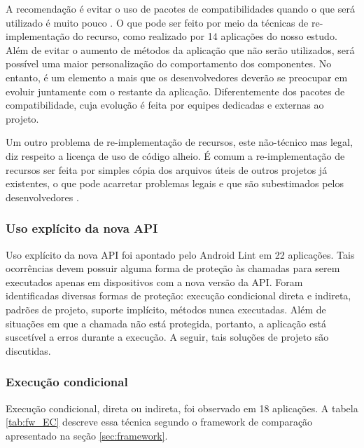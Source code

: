 A recomendação é evitar o uso de pacotes de compatibilidades quando o que será
utilizado é muito pouco \cite{Estouro}. O que pode ser feito por meio da técnicas
de re-implementação do recurso, como realizado por 14 aplicações do nosso estudo.
Além de evitar o aumento de métodos da aplicação que não serão utilizados, será
possível uma maior personalização do comportamento dos componentes. No entanto,
é um elemento a mais que os desenvolvedores deverão se preocupar em evoluir
juntamente com o restante da aplicação. Diferentemente dos pacotes de compatibilidade,
cuja evolução é feita por equipes dedicadas e externas ao projeto.

Um outro problema de re-implementação de recursos, este não-técnico mas legal,
diz respeito a licença de uso de código alheio. É comum a re-implementação de
recursos ser feita por simples cópia dos arquivos úteis de outros projetos já
existentes, o que pode acarretar problemas legais e que são subestimados pelos
desenvolvedores \cite{Minelli}.

\subsubsection{Uso explícito da nova API}
Uso explícito da nova API foi apontado pelo Android Lint em 22 aplicações. Tais
ocorrências devem possuir alguma forma de proteção às chamadas para serem executados
apenas em dispositivos com a nova versão da API.  Foram identificadas diversas formas
de proteção: execução condicional direta e indireta, padrões de projeto, suporte implícito,
métodos nunca executadas. Além de situações em que a chamada não está protegida, portanto,
a aplicação está suscetível a erros durante a execução.  A seguir, tais soluções de projeto
são discutidas.

\subsubsection*{Execução condicional}

Execução condicional, direta ou indireta, foi observado em 18 aplicações.
A tabela \ref{tab:fw_EC} descreve essa técnica segundo o framework de
comparação apresentado na seção \ref{sec:framework}.

